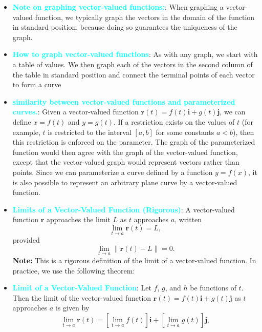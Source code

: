 \documentclass{report}
\begin{document}
\begin{itemize}
        \item \textbf{\textcolor{cyan}{Note on graphing vector-valued functions:}}: When graphing a vector-valued function, we typically graph the vectors in the domain of the function in standard position, because doing so guarantees the uniqueness of the graph.
        \item \textbf{\textcolor{cyan}{How to graph vector-valued functions}}: As with any graph, we start with a table of values. We then graph each of the vectors in the second column of the table in standard position and connect the terminal points of each vector to form a curve
            \bigbreak \noindent 
        \item \textbf{\textcolor{cyan}{similarity between vector-valued functions and parameterized curves.}}:
            Given a vector-valued function \( \mathbf{r}(t) = f(t)\mathbf{i} + g(t)\mathbf{j} \), we can define \( x = f(t) \) and \( y = g(t) \). If a restriction exists on the values of \( t \) (for example, \( t \) is restricted to the interval \([a, b]\) for some constants \( a < b \)), then this restriction is enforced on the parameter. The graph of the parameterized function would then agree with the graph of the vector-valued function, except that the vector-valued graph would represent vectors rather than points. Since we can parameterize a curve defined by a function \( y = f(x) \), it is also possible to represent an arbitrary plane curve by a vector-valued function.
        \item \textbf{\textcolor{cyan}{Limits of a Vector-Valued Function (Rigorous)}}:
            A vector-valued function \(\mathbf{r}\) approaches the limit \(L\) as \(t\) approaches \(a\), written
            \[
                \lim_{t \to a} \mathbf{r}(t) = L,
            \]
            provided
            \[
                \lim_{t \to a} \|\mathbf{r}(t) - L\| = 0.
            \]
            \textbf{Note:} This is a rigorous definition of the limit of a vector-valued function. In practice, we use the following theorem:
        \item \textbf{\textcolor{cyan}{Limit of a Vector-Valued Function}}:
            Let \(f\), \(g\), and \(h\) be functions of \(t\). Then the limit of the vector-valued function  \(\mathbf{r}(t) = f(t)\mathbf{i} + g(t)\mathbf{j}\) as \(t\) approaches \(a\) is given by
            \[
                \lim_{t \to a} \mathbf{r}(t) = \left[ \lim_{t \to a} f(t) \right]\mathbf{i} + \left[ \lim_{t \to a} g(t) \right]\mathbf{j},
            \]

\end{itemize}
\end{document}

